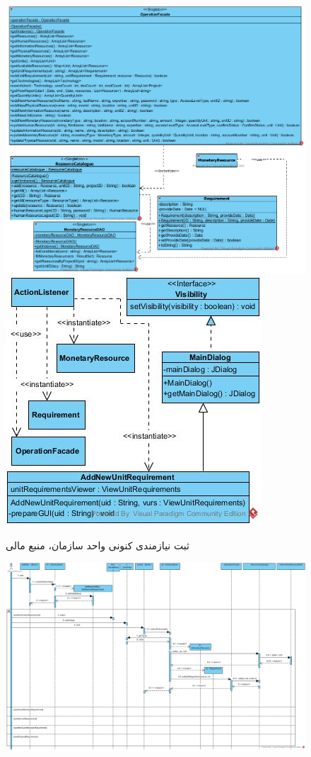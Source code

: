 \begin{landscape}
\begin{figure}[H]
	\includegraphics[scale=0.45]{img/sequence-design/AddRequirementToUnit_MONETARYC}
	\includegraphics[scale=0.45]{img/sequence-design/AddRequirementToUnit_MONETARYUI}
	\caption{ثبت نیازمندی کنونی واحد سازمان، منبع مالی}
\end{figure}
\begin{figure}[H]
	\centering
	\includegraphics[scale=0.5]{img/sequence-design/AddRequirementToUnit_INFORMATION}

\end{figure}
\end{landscape}
